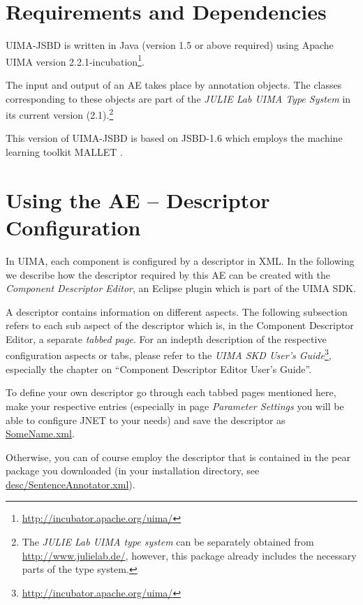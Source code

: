 \documentclass[11pt,a4paper,halfparskip]{scrartcl}
\begin{document}
\section{Requirements and Dependencies}

UIMA-JSBD is written in Java (version 1.5 or above required) using
Apache UIMA version
2.2.1-incubation\footnote{\url{http://incubator.apache.org/uima/}}.

The input and output of an AE takes place by annotation objects. The
classes corresponding to these objects are part of the \emph{JULIE Lab
  UIMA Type System} in its current version (2.1).\footnote{The
  \emph{JULIE Lab UIMA type system} can be separately obtained from
  \url{http://www.julielab.de/}, however, this package already
  includes the necessary parts of the type system.}

This version of UIMA-JSBD is based on JSBD-1.6 which employs the
machine learning toolkit MALLET \cite{McCallum2002}.




\section{Using the AE -- Descriptor Configuration}

In UIMA, each component is configured by a descriptor in XML. In the
following we describe how the descriptor required by this AE can be
created with the \emph{Component Descriptor Editor}, an Eclipse plugin
which is part of the UIMA SDK.

A descriptor contains information on different aspects. The following
subsection refers to each sub aspect of the descriptor which is, in
the Component Descriptor Editor, a separate \emph{tabbed page}. For an
indepth description of the respective configuration aspects or tabs,
please refer to the \emph{UIMA SKD User's
  Guide}\footnote{\url{http://incubator.apache.org/uima/}}, especially
the chapter on ``Component Descriptor Editor User's Guide''.

To define your own descriptor go through each tabbed pages mentioned
here, make your respective entries (especially in page \emph{Parameter
  Settings} you will be able to configure JNET to your needs) and save
the descriptor as \url{SomeName.xml}.

Otherwise, you can of course employ the descriptor that is contained
in the pear package you downloaded (in your installation directory, see
\url{desc/SentenceAnnotator.xml}).
\end{document}
